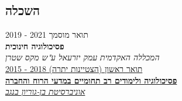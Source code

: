 \documentclass[
	11pt,a4paper %
]{article}
\newcommand{\qualificationentry}[5]{
	\raggedleft\textsc{#1} & \textbf{#2}\\ %
	\raggedleft\expandafter\ifstrequal\expandafter{#3}{}{}{& {\raggedleft\small\textsc{#3}}\\} %
	\raggedleft\expandafter\ifstrequal\expandafter{#4}{}{}{& #4\\} %
	\raggedleft\expandafter\ifstrequal\expandafter{#5}{}{}{& \textit{#5}\\[5pt]} %
}
\begin{document}
\setRTL
\begin{hebrew}
\begin{paracol}{2} %


	\section{השכלה}







תואר מוסמך \hfill 2021 - 2019 \\
\textbf{פסיכולוגיה חינוכית} \\
\textit{המכללה האקדמית עמק יזרעאל ע"ש מקס שטרן} \\

\href{https://loona-il.000webhostapp.com/resume-references/BA-and-honorary.pdf}{תואר ראשון (הצטיינות יתרה) \hfill 2018 - 2015} \\
\href{https://loona-il.000webhostapp.com/resume-references/BA-and-honorary.pdf}{\textbf{פסיכולוגיה ולימודים רב תחומיים במדעי הרוח והחברה}} \\
\href{https://loona-il.000webhostapp.com/resume-references/BA-and-honorary.pdf}{\textit{אוניברסיטת בן-גוריון בנגב}}

%


\end{paracol}
\end{hebrew}
\end{document}
